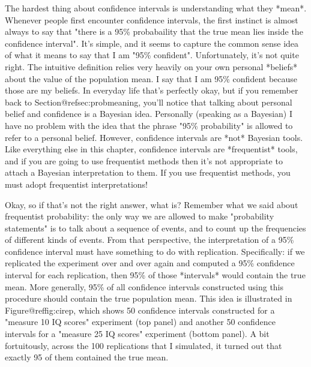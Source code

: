 The hardest thing about confidence intervals is understanding what they *mean*. Whenever people first encounter confidence intervals, the first instinct is almost always to say that "there is a 95\% probabaility that the true mean lies inside the confidence interval". It's simple, and it seems to capture the common sense idea of what it means to say that I am "95\% confident". Unfortunately, it's not quite right. The intuitive definition relies very heavily on your own personal *beliefs* about the value of the population mean. I say that I am 95\% confident because those are my beliefs. In everyday life that's perfectly okay, but if you remember back to Section@refsec:probmeaning, you'll notice that talking about personal belief and confidence is a Bayesian idea. Personally (speaking as a Bayesian) I have no problem with the idea that the phrase "95\% probability" is allowed to refer to a personal belief. However, confidence intervals are *not* Bayesian tools. Like everything else in this chapter, confidence intervals are *frequentist* tools, and if you are going to use frequentist methods then it's not appropriate to attach a Bayesian interpretation to them. If you use frequentist methods, you must adopt frequentist interpretations!

Okay, so if that's not the right answer, what is? Remember what we said about frequentist probability: the only way we are allowed to make "probability statements" is to talk about a sequence of events, and to count up the frequencies of different kinds of events. From that perspective, the interpretation of a 95\% confidence interval must have something to do with replication. Specifically: if we replicated the experiment over and over again and computed a 95\% confidence interval for each replication, then 95\% of those *intervals* would contain the true mean. More generally, 95\% of all confidence intervals constructed using this procedure should contain the true population mean. This idea is illustrated in Figure@reffig:cirep, which shows 50 confidence intervals constructed for a "measure 10 IQ scores" experiment (top panel) and another 50 confidence intervals for a "measure 25 IQ scores" experiment (bottom panel). A bit fortuitously, across the 100 replications that I simulated, it turned out that exactly 95 of them contained the true mean. 




